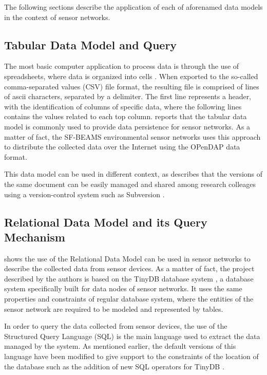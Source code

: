 The following sections describe the application of each of aforenamed data
models in the context of sensor networks.

\subsection{Tabular Data Model and Query}

The most basic computer application to process data is through the use of
spreadsheets, where data is organized into cells \cite{tabular-model}. When
exported to the so-called comma-separated values (CSV) file format, the
resulting file is comprised of lines of ascii characters, separated by a
delimiter. The first line represents a header, with the identification of
columns of specific data, where the following lines contains the values
related to each top column. \cite{sn-provenance} reports that the tabular
data model is commonly used to provide data persistence for sensor networks.
As a matter of fact, the SF-BEAMS environmental sensor networks
\cite{sfbeams2006} uses this approach to distribute the collected data over
the Internet using the OPenDAP \cite{opendap} data format.

This data model can be used in different context, as \cite{sn-provenance}
describes that the versions of the same document can be easily managed and
shared among research colleages using a version-control system such as
Subversion \cite{subversion}.

\subsection{Relational Data Model and its Query Mechanism}

\cite{sn-db-newop} shows the use of the Relational Data Model
\cite{relational-model} can be used in sensor networks to describe the
collected data from sensor devices. As a matter of fact, the project described
by the authors is based on the TinyDB database system \cite{sn-db-tinydb}, a
database system specifically built for data nodes of sensor networks. It uses
the same properties and constraints of regular database system, where the
entities of the sensor network are required to be modeled and represented by
tables.

In order to query the data collected from sensor devices, the use of the 
Structured Query Language (SQL) \cite{sql} is the main language used to extract
the data managed by the system. As mentioned earlier, the default versions of
this language have been modified to give support to the constraints of the
location of the database such as the addition of new SQL operators for TinyDB
\cite{sn-db-newop}.


